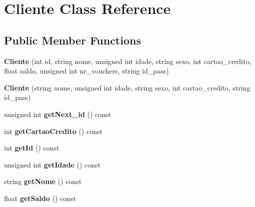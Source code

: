 \hypertarget{class_cliente}{\section{Cliente Class Reference}
\label{class_cliente}
}
\subsection*{Public Member Functions}
\begin{DoxyCompactItemize}
\item 
\hypertarget{class_cliente_a60db1e1e5141e29c8888a48f9b5140bb}{{\bfseries Cliente} (int id, string nome, unsigned int idade, string sexo, int cartao\+\_\+credito, float saldo, unsigned int nr\+\_\+vouchers, string id\+\_\+pass)}\label{class_cliente_a60db1e1e5141e29c8888a48f9b5140bb}

\item 
\hypertarget{class_cliente_a76a537299eb371d3b2b1d0f7bdf7a7e8}{{\bfseries Cliente} (string nome, unsigned int idade, string sexo, int cartao\+\_\+credito, string id\+\_\+pass)}\label{class_cliente_a76a537299eb371d3b2b1d0f7bdf7a7e8}

\item 
\hypertarget{class_cliente_af76bd3dca7cc6a21f94ee57c06de4427}{unsigned int {\bfseries get\+Next\+\_\+id} () const }\label{class_cliente_af76bd3dca7cc6a21f94ee57c06de4427}

\item 
\hypertarget{class_cliente_a9303d7e564ead678ba2bcb13157524a5}{int {\bfseries get\+Cartao\+Credito} () const }\label{class_cliente_a9303d7e564ead678ba2bcb13157524a5}

\item 
\hypertarget{class_cliente_a57130129d927bb9e777ccdecb8918db4}{int {\bfseries get\+Id} () const }\label{class_cliente_a57130129d927bb9e777ccdecb8918db4}

\item 
\hypertarget{class_cliente_ac182c452fcf4daac306280f707b16992}{unsigned int {\bfseries get\+Idade} () const }\label{class_cliente_ac182c452fcf4daac306280f707b16992}

\item 
\hypertarget{class_cliente_a0325de899469e2fed48ffda2b5b291cf}{string {\bfseries get\+Nome} () const }\label{class_cliente_a0325de899469e2fed48ffda2b5b291cf}

\item 
\hypertarget{class_cliente_ac91943541afd55e1b8e7d3139197b3b0}{float {\bfseries get\+Saldo} () const }\label{class_cliente_ac91943541afd55e1b8e7d3139197b3b0}


\end{DoxyCompactItemize}
